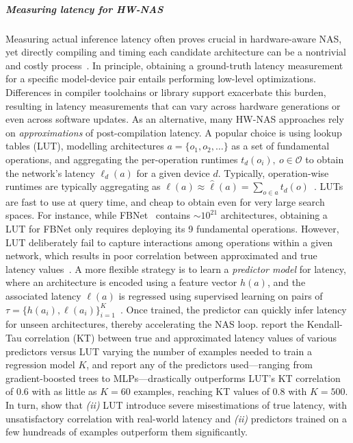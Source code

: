 \subparagraph{Measuring latency for HW-NAS}
Measuring actual inference latency often proves crucial in hardware-aware NAS, yet directly compiling and timing each candidate architecture can be a nontrivial and costly process~\citep{li2021hw}. In principle, obtaining a ground-truth latency measurement for a specific model-device pair entails performing low-level optimizations. Differences in compiler toolchains or library support exacerbate this burden, resulting in latency measurements that can vary across hardware generations or even across software updates.
As an alternative, many HW-NAS approaches rely on \emph{approximations} of post-compilation latency. 
A popular choice is using lookup tables (LUT), modelling architectures \( a = \{o_1, o_2, \dots \} \) as a set of fundamental operations, and aggregating the per-operation runtimes \( t_d(o_i), \ o \in \mathcal O \) to obtain the network's latency \( \ell_d(a) \) for a given device \( d \). 
Typically, operation-wise runtimes are typically aggregating as \(\ell (a) \approx \hat{\ell}(a) = \sum_{o \in a} t_d(o) \)~\citep{wu2019fbnet,cai2018proxylessnas}. 
LUTs are fast to use at query time, and cheap to obtain even for very large search spaces. 
For instance, while FBNet~\citep{wu2019fbnet} contains \(\sim10^{21} \) architectures, obtaining a LUT for FBNet only requires deploying its 9 fundamental operations.
However, LUT deliberately fail to capture interactions among operations within a given network, which results in poor correlation between approximated and true latency values~\citep{laube2022expect}.
A more flexible strategy is to learn a \emph{predictor model} for latency, where an architecture is encoded using a feature vector \( h(a) \), and the associated latency \( \ell(a) \) is regressed using supervised learning on pairs of \( \tau = \{h(a_i), \ell(a_i)\}_{i=1}^{K} \)~\citep{laube2022expect}. Once trained, the predictor can quickly infer latency for unseen architectures, thereby accelerating the NAS loop.
\citet{laube2022expect} report the Kendall-Tau correlation (KT) between true and approximated latency values of various predictors versus LUT varying the number of examples needed to train a regression model \( K \), and report any of the predictors used---ranging from gradient-boosted trees to MLPs---drastically outperforms LUT's KT correlation of 0.6 with as little as \(K=60\) examples, reaching KT values of 0.8 with \( K = 500 \). 
In turn, \citet{laube2022expect} show that \emph{(ii)} LUT introduce severe misestimations of true latency, with unsatisfactory correlation with real-world latency and \emph{(ii)} predictors trained on a few hundreads of examples outperform them significantly.
